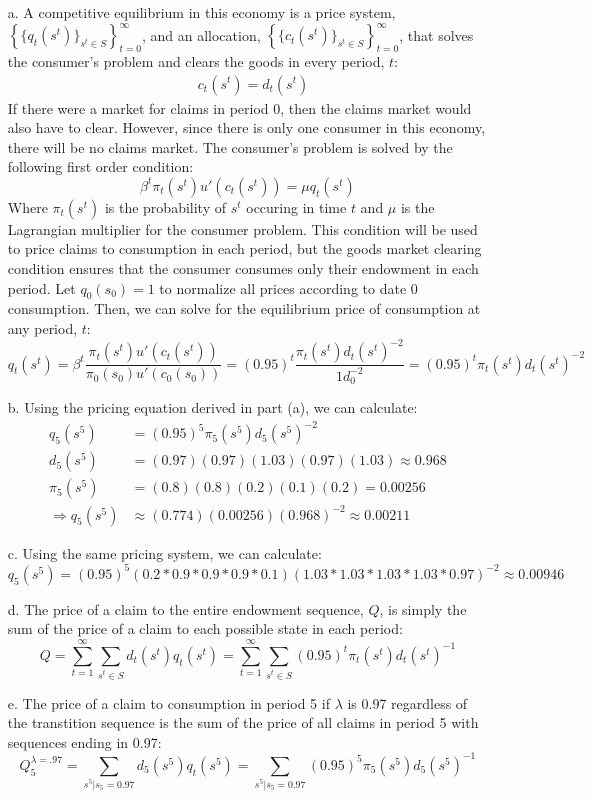 \documentclass{article}
\begin{document}
\begin{itemize}
	\item[a.] A competitive equilibrium in this economy is a price system, ${\left\{\{q_t(s^t)\}_{s^t\in S}\right\}_{t=0}^\infty}$, and an allocation, ${\left\{\{c_t(s^t)\}_{s^t\in S}\right\}_{t=0}^\infty}$, that solves the consumer's problem and clears the goods in every period, $t$:
		\begin{align*} &c_t(s^t) = d_t(s^t)  \end{align*}
		If there were a market for claims in period 0, then the claims market would also have to clear. However, since there is only one consumer in this economy, there will be no claims market. The consumer's problem is solved by the following first order condition:
		\[
			\beta^t\pi_t(s^t)u'(c_t(s^t)) = \mu q_t(s^t)
		\]
		Where $\pi_t(s^t)$ is the probability of $s^t$ occuring in time $t$ and $\mu$ is the Lagrangian multiplier for the consumer problem. This condition will be used to price claims to consumption in each period, but the goods market clearing condition ensures that the consumer consumes only their endowment in each period. Let ${q_0(s_0)=1}$ to normalize all prices according to date 0 consumption. Then, we can solve for the equilibrium price of consumption at any period, $t$:
		\[
			q_t(s^t) = \beta^t\frac{\pi_t(s^t)u'(c_t(s^t))}{\pi_0(s_0)u'(c_0(s_0))} = (0.95)^t\frac{\pi_t(s^t)d_t(s^t)^{-2}}{1d_0^{-2}} = (0.95)^t\pi_t(s^t)d_t(s^t)^{-2}
		\]
	
	\item[b.] Using the pricing equation derived in part (a), we can calculate:
		\begin{align*}
						q_5(s^5)	&= (0.95)^5\pi_5(s^5)d_5(s^5)^{-2}						\\
						d_5(s^5)	&= (0.97)(0.97)(1.03)(0.97)(1.03) \approx 0.968			\\
						\pi_5(s^5)	&= (0.8)(0.8)(0.2)(0.1)(0.2) = 0.00256					\\
			\Rightarrow q_5(s^5)	&\approx (0.774)(0.00256)(0.968)^{-2} \approx 0.00211
		\end{align*}
	
	\item[c.] Using the same pricing system, we can calculate:
		\[
			q_5(s^5) = (0.95)^5\left(0.2*0.9*0.9*0.9*0.1\right)\left(1.03*1.03*1.03*1.03*0.97\right)^{-2} \approx 0.00946
		\]
	
	\item[d.] The price of a claim to the entire endowment sequence, $Q$, is simply the sum of the price of a claim to each possible state in each period:
		\[
			Q = \sum_{t=1}^\infty \sum_{s^t\in S} d_t(s^t)q_t(s^t) = \sum_{t=1}^\infty \sum_{s^t\in S} (0.95)^t\pi_t(s^t)d_t(s^t)^{-1}
		\]
	
	\item[e.] The price of a claim to consumption in period 5 if $\lambda$ is 0.97 regardless of the transtition sequence is the sum of the price of all claims in period 5 with sequences ending in 0.97:
		\[
			Q_5^{\lambda = .97} = \sum_{s^5|s_5=0.97} d_5(s^5)q_t(s^5) = \sum_{s^5|s_5=0.97}(0.95)^5\pi_5(s^5)d_5(s^5)^{-1}
		\]
	
\end{itemize}
\end{document}
